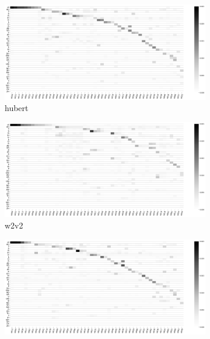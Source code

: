 {
\begin{figure}
     \centering
     \begin{subfigure}[t]{0.3\textwidth}
         \centering
         \includegraphics[width=1\linewidth]{figures/hubert-50-joint-byprob--new1.png}
         \caption{hubert}
         \label{fig:ch3-heatmap-model--hubert-50-joint-byprob}
     \end{subfigure}
     \vfill
     \begin{subfigure}[t]{0.3\textwidth}
         \centering
         \includegraphics[width=1\linewidth]{figures/w2v2-50-joint-byprob.png}
         \caption{w2v2}
         \label{fig:ch3-heatmap-model--w2v2-50-joint-byprob}
     \end{subfigure}
     \vfill
     \begin{subfigure}[t]{0.3\textwidth}
         \centering
         \includegraphics[width=1\linewidth]{figures/cpc-50-joint-byprob.png}

\end{subfigure}
\end{figure}}
